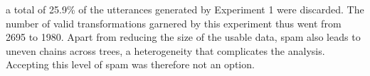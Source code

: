 a total of 25.9\% of the utterances generated by Experiment 1 were discarded.
The number of valid transformations garnered by this experiment thus
went from 2695 to 1980. Apart from reducing the size of the usable data,
spam also leads to uneven chains across trees, a heterogeneity that
complicates the analysis. Accepting this level of spam was therefore not
an option.

